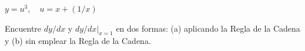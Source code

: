 \item $y = u^3, \quad u = x + (1/x)$
\par
Encuentre $dy/dx$ y $dy/dx|_{x=1}$ en dos formas: (a) aplicando la Regla de la Cadena y (b) sin emplear la Regla de la Cadena.
